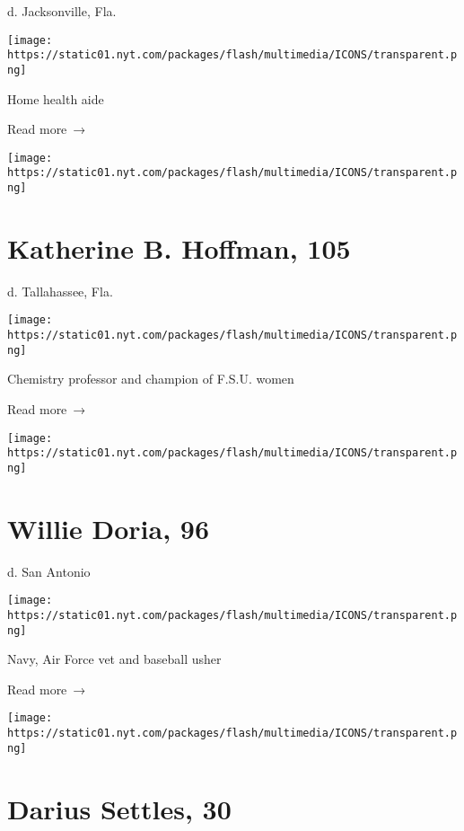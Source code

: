 d. Jacksonville, Fla.

\texttt{[image: https://static01.nyt.com/packages/flash/multimedia/ICONS/transparent.png]}

Home health aide

 Read more~→

\href{https://www.nytimes.com/2020/07/29/obituaries/katherine-hoffman-dead-coronavirus.html}{}

\texttt{[image: https://static01.nyt.com/packages/flash/multimedia/ICONS/transparent.png]}

\hypertarget{katherine-b-hoffman-105}{%
\section{Katherine B. Hoffman, 105}\label{katherine-b-hoffman-105}}

d. Tallahassee, Fla.

\texttt{[image: https://static01.nyt.com/packages/flash/multimedia/ICONS/transparent.png]}

Chemistry professor and champion of F.S.U. women

 Read more~→

\href{https://www.nytimes.com/2020/07/28/obituaries/willie-doria-dead-coronavirus.html}{}

\texttt{[image: https://static01.nyt.com/packages/flash/multimedia/ICONS/transparent.png]}

\hypertarget{willie-doria-96}{%
\section{Willie Doria, 96}\label{willie-doria-96}}

d. San Antonio

\texttt{[image: https://static01.nyt.com/packages/flash/multimedia/ICONS/transparent.png]}

Navy, Air Force vet and baseball usher

 Read more~→

\href{https://www.nytimes.com/2020/07/27/obituaries/darius-settles-dead-coronavirus.html}{}

\texttt{[image: https://static01.nyt.com/packages/flash/multimedia/ICONS/transparent.png]}

\hypertarget{darius-settles-30}{%
\section{Darius Settles, 30}\label{darius-settles-30}}


